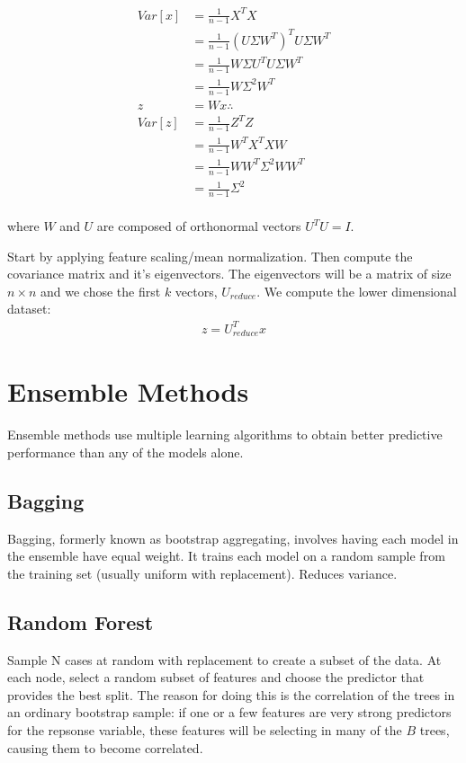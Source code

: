 \documentclass[12pt]{article}
\begin{document}
\begin{&itemize}
\begin{align*}
Var[x] & = \frac{1}{n-1}X^TX \\
& =  \frac{1}{n-1}(U\Sigma W^T)^TU\Sigma W^T \\
& =  \frac{1}{n-1}W\Sigma U^TU\Sigma W^T \\
& =  \frac{1}{n-1}W\Sigma^2 W^T \\
z &= Wx\therefore \\
Var[z] &= \frac{1}{n-1}Z^TZ \\
& = \frac{1}{n-1}W^TX^TXW \\
& = \frac{1}{n-1}WW^T\Sigma^2WW^T \\
& = \frac{1}{n-1}\Sigma^2 \\
\end{align*}

where $W$ and $U$ are composed of orthonormal vectors $U^TU=I$.  

Start by applying feature scaling/mean normalization. Then compute the covariance matrix and it's eigenvectors. The eigenvectors will be a matrix of size $n\times n$ and we chose the first $k$ vectors, $U_{reduce}$. We compute the lower dimensional dataset:
\begin{align*}
z = U_{reduce}^Tx
\end{align*}

\section{Ensemble Methods}
Ensemble methods use multiple learning algorithms to obtain better predictive performance than any of the models alone.

\subsection{Bagging}
Bagging, formerly known as bootstrap aggregating, involves having each model in the ensemble have equal weight. It trains each model on a random sample from the training set (usually uniform with replacement). Reduces variance.

\subsection{Random Forest}
Sample N cases at random with replacement to create a subset of the data. At each node, select a random subset of features and choose the predictor that provides the best split. The reason for doing this is the correlation of the trees in an ordinary bootstrap sample: if one or a few features are very strong predictors for the repsonse variable, these features will be selecting in many of the $B$ trees, causing them to become correlated.


\end{&itemize}
\end{document}
